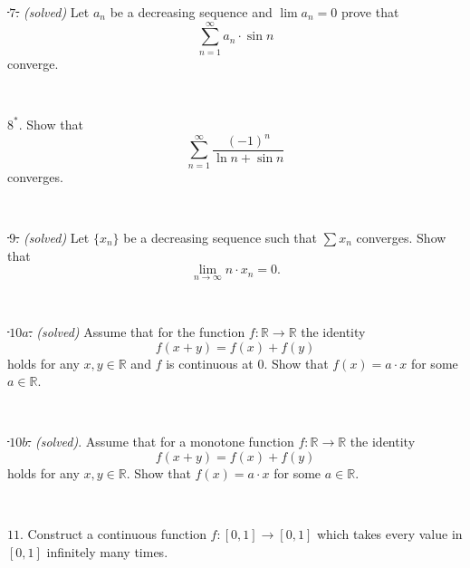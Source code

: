 \documentclass{article}
\def\noi{\noindent}%
\def\RR{\mathbb{R}}%
\begin{document}
\noi \sout{\,$7$.} \textit{(solved)} Let $a_n$ be a decreasing sequence and $\lim a_n=0$ prove that 
$$\sum_{n=1}^\infty  a_n\cdot\sin n$$ 
converge.

\ 

\noi $8^*\!$. Show that 
$$\sum_{n=1}^\infty  \frac{(-1)^n}{\ln n+\sin n}$$ 
converges.

\ 

\noi \sout{\,$9$.} \textit{(solved)}
Let $\{ x_n \}$ be a decreasing sequence such that $\sum x_n$ converges.
Show that 
\[\lim_{n\to\infty} n{\cdot}x_n = 0.\]

\ 

\noi \sout{\,$10a$.} \textit{(solved)}
Assume that for the function $f \colon \RR \to \RR$ the identity
\[f(x+y) = f(x) + f(y)\]
holds for any $x,y\in\RR$ and $f$ is continuous at $0$.
Show that $f(x) = a\cdot x$ for some $a \in \RR$.


\ 

\noi \sout{\,$10b$.} \textit{(solved)}.
Assume that for a monotone function $f \colon \RR \to \RR$ the identity
\[f(x+y) = f(x) + f(y)\]
holds for any $x,y\in\RR$.
Show that $f(x) = a\cdot x$ for some $a \in \RR$.


\ 

\noi $11$. Construct a continuous function $f \colon [0,1] \to [0,1]$ which takes every value in $[0,1]$ infinitely many times.
\end{document}
